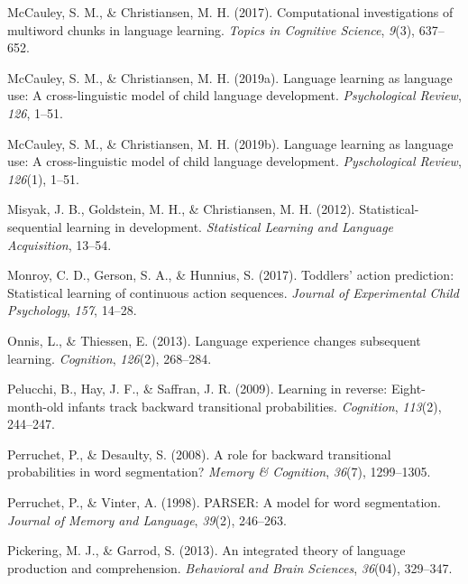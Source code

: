 \documentclass[
  english,
  man,floatsintext]{apa6}
\begin{document}
\leavevmode\hypertarget{ref-mccauley2017computational}{}%
McCauley, S. M., \& Christiansen, M. H. (2017). Computational investigations of multiword chunks in language learning. \emph{Topics in Cognitive Science}, \emph{9}(3), 637--652.

\leavevmode\hypertarget{ref-mccauley2019language}{}%
McCauley, S. M., \& Christiansen, M. H. (2019a). Language learning as language use: A cross-linguistic model of child language development. \emph{Psychological Review}, \emph{126}, 1--51.

\leavevmode\hypertarget{ref-mccauley2019languagelearning}{}%
McCauley, S. M., \& Christiansen, M. H. (2019b). Language learning as language use: A cross-linguistic model of child language development. \emph{Pyschological Review}, \emph{126}(1), 1--51.

\leavevmode\hypertarget{ref-misyak2012statistical}{}%
Misyak, J. B., Goldstein, M. H., \& Christiansen, M. H. (2012). Statistical-sequential learning in development. \emph{Statistical Learning and Language Acquisition}, 13--54.

\leavevmode\hypertarget{ref-monroy2017toddlers}{}%
Monroy, C. D., Gerson, S. A., \& Hunnius, S. (2017). Toddlers' action prediction: Statistical learning of continuous action sequences. \emph{Journal of Experimental Child Psychology}, \emph{157}, 14--28.

\leavevmode\hypertarget{ref-onnis2013language}{}%
Onnis, L., \& Thiessen, E. (2013). Language experience changes subsequent learning. \emph{Cognition}, \emph{126}(2), 268--284.

\leavevmode\hypertarget{ref-pelucchi2009learning}{}%
Pelucchi, B., Hay, J. F., \& Saffran, J. R. (2009). Learning in reverse: Eight-month-old infants track backward transitional probabilities. \emph{Cognition}, \emph{113}(2), 244--247.

\leavevmode\hypertarget{ref-perruchet2008role}{}%
Perruchet, P., \& Desaulty, S. (2008). A role for backward transitional probabilities in word segmentation? \emph{Memory \& Cognition}, \emph{36}(7), 1299--1305.

\leavevmode\hypertarget{ref-perruchet1998parser}{}%
Perruchet, P., \& Vinter, A. (1998). PARSER: A model for word segmentation. \emph{Journal of Memory and Language}, \emph{39}(2), 246--263.

\leavevmode\hypertarget{ref-pickering2013integrated}{}%
Pickering, M. J., \& Garrod, S. (2013). An integrated theory of language production and comprehension. \emph{Behavioral and Brain Sciences}, \emph{36}(04), 329--347.
\end{document}

